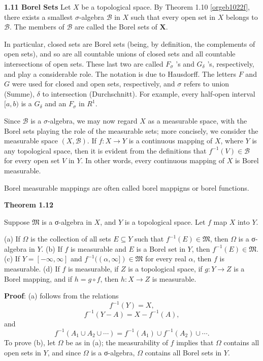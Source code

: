 \documentclass[11pt]{article}
\begin{document}
\medskip
\label{orgf43ea85}
\textbf{1.11 Borel Sets} Let \(X\) be a topological space. By Theorem 1.10 \ref{orgeb1022f}, there exists a smallest \(\sigma\)-algebra \(\mathscr{B}\) in \(X\) such that every open set in \(X\) belongs to \(\mathscr{B}\). The members of \(\mathscr{B}\) are called the Borel sets of \(\boldsymbol{X}\).

In particular, closed sets are Borel sets (being, by definition, the complements of open sets), and so are all countable unions of closed sets and all countable intersections of open sets. These last two are called \(F_\sigma\) 's and \(G_\delta\) 's, respectively, and play a considerable role. The notation is due to Hausdorff. The letters \(F\) and \(G\) were used for closed and open sets, respectively, and \(\sigma\) refers to union (Summe), \(\delta\) to intersection (Durchschnitt). For example, every half-open interval \([a, b)\) is a \(G_\delta\) and an \(F_\sigma\) in \(R^1\).

Since \(\mathscr{B}\) is a \(\sigma\)-algebra, we may now regard \(X\) as a measurable space, with the Borel sets playing the role of the measurable sets; more concisely, we consider the measurable space \((X, \mathscr{B})\). If \(f: X \rightarrow Y\) is a continuous mapping of \(X\), where \(Y\) is any topological space, then it is evident from the definitions that \(f^{-1}(V) \in \mathscr{B}\) for every open set \(V\) in \(Y\). In other words, every continuous mapping of \(X\) is Borel measurable.

Borel measurable mappings are often called borel mappigns or borel functions.


\medskip
\label{orgbdddc94} \textbf{Theorem 1.12}

Suppose \(\mathfrak{M}\) is a σ-algebra in \(X\), and \(Y\) is a topological space. Let \(f\) map \(X\) into \(Y\).

(a) If \(\Omega\) is the collection of all sets \(E \subseteq Y\) such that \(f^{-1}(E) \in \mathfrak M\), then \(\Omega\) is a σ-algebra in \(Y\).
(b) If \(f\) is measurable and \(E\) is a Borel set in \(Y\), then \(f^{-1}(E) \in \mathfrak M\).
(c) If \(Y = [-\infty, \infty]\) and \(f^{-1}((\alpha, \infty]) \in \mathfrak M\) for every real \(\alpha\), then \(f\) is measurable.
(d) If \(f\) is measurable, if \(Z\) is a topological space, if \(g: Y \to Z\) is a Borel mapping, and if \(h = g \circ f\), then \(h: X \to Z\) is measurable.

\textbf{\textbf{Proof}}: (a) follows from the relations
\[ f^{-1}(Y) = X, \]
\[ f^{-1}(Y - A) = X - f^{-1}(A), \]
and
\[ f^{-1}(A_1 \cup A_2 \cup \cdots) = f^{-1}(A_1) \cup f^{-1}(A_2) \cup \cdots. \]
To prove (b), let \(\Omega\) be as in (a); the measurability of \(f\) implies that \(\Omega\) contains all open sets in \(Y\), and since \(\Omega\) is a σ-algebra, \(\Omega\) contains all Borel sets in \(Y\).
\end{document}
